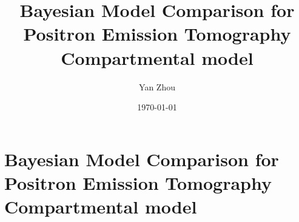\documentclass[11pt, hyper, bib, fontset=Minion]{marticle}
\title{Bayesian Model Comparison for Positron Emission Tomography
  Compartmental model}
\author{Yan Zhou}
\date{\today}
\begin{document}
\maketitle

\else %

\chapter{Bayesian Model Comparison for Positron Emission Tomography
  Compartmental model}
\label{cha:Bayesian Model Comparison for Positron Emission Tomography
  Compartmental model}

\fi %


\ifx\inthesis\undefined
\printbibliography
\end{document}
